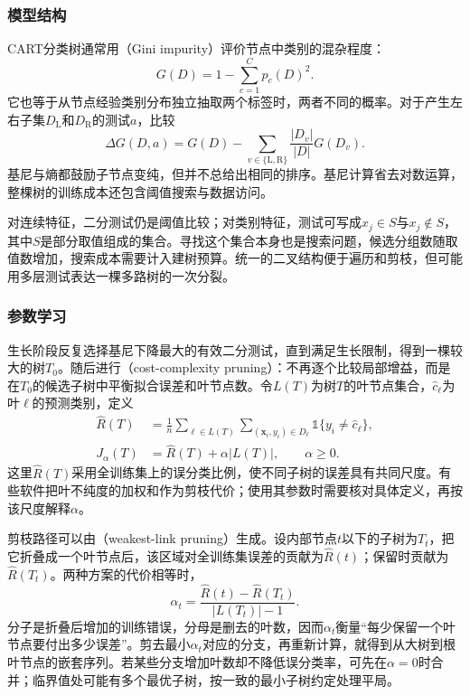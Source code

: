 \subsubsection{模型结构}
\label{sec:classification-cart-structure}

CART分类树通常用（Gini impurity）评价节点中类别的混杂程度：
\begin{equation}
  G(D)=1-\sum_{c=1}^{C}p_c(D)^2.
  \label{eq:classification-gini}
\end{equation}
它也等于从节点经验类别分布独立抽取两个标签时，两者不同的概率。对于产生左右子集$D_{\mathrm{L}}$和$D_{\mathrm{R}}$的测试$a$，比较
\begin{equation}
  \Delta G(D,a)=G(D)
  -\sum_{v\in\{\mathrm{L},\mathrm{R}\}}
  \frac{|D_v|}{|D|}G(D_v).
  \label{eq:classification-gini-decrease}
\end{equation}
基尼与熵都鼓励子节点变纯，但并不总给出相同的排序。基尼计算省去对数运算，整棵树的训练成本还包含阈值搜索与数据访问。

对连续特征，二分测试仍是阈值比较；对类别特征，测试可写成$x_j\in S$与$x_j\notin S$，其中$S$是部分取值组成的集合。寻找这个集合本身也是搜索问题，候选分组数随取值数增加，搜索成本需要计入建树预算。统一的二叉结构便于遍历和剪枝，但可能用多层测试表达一棵多路树的一次分裂。

\subsubsection{参数学习}
\label{sec:classification-cart-learning}

生长阶段反复选择基尼下降最大的有效二分测试，直到满足生长限制，得到一棵较大的树$T_0$。随后进行（cost-complexity pruning）：不再逐个比较局部增益，而是在$T_0$的候选子树中平衡拟合误差和叶节点数。令$L(T)$为树$T$的叶节点集合，$\hat c_\ell$为叶$\ell$的预测类别，定义
\begin{align}
  \widehat R(T)
  &=\frac{1}{n}\sum_{\ell\in L(T)}
    \sum_{(\bm{x}_i,y_i)\in D_\ell}
    \mathbb{1}\{y_i\neq\hat c_\ell\},
  \label{eq:classification-cart-empirical-risk}\\
  J_\alpha(T)&=\widehat R(T)+\alpha|L(T)|,
  \qquad \alpha\geq0.
  \label{eq:classification-cart-cost-complexity}
\end{align}
这里$\widehat R(T)$采用全训练集上的误分类比例，使不同子树的误差具有共同尺度。有些软件把叶不纯度的加权和作为剪枝代价；使用其参数时需要核对具体定义，再按该尺度解释$\alpha$。

剪枝路径可以由（weakest-link pruning）生成。设内部节点$t$以下的子树为$T_t$，把它折叠成一个叶节点后，该区域对全训练集误差的贡献为$\widehat R(t)$；保留时贡献为$\widehat R(T_t)$。两种方案的代价相等时，
\begin{equation}
  \alpha_t=
  \frac{\widehat R(t)-\widehat R(T_t)}
       {|L(T_t)|-1}.
  \label{eq:classification-weakest-link}
\end{equation}
分子是折叠后增加的训练错误，分母是删去的叶数，因而$\alpha_t$衡量“每少保留一个叶节点要付出多少误差”。剪去最小$\alpha_t$对应的分支，再重新计算，就得到从大树到根叶节点的嵌套序列。若某些分支增加叶数却不降低误分类率，可先在$\alpha=0$时合并；临界值处可能有多个最优子树，按一致的最小子树约定处理平局。

